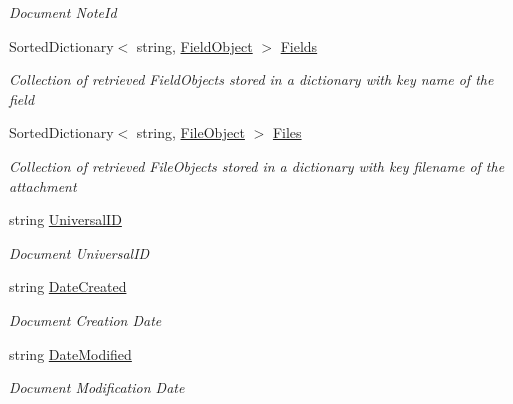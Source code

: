 \begin{DoxyCompactItemize}
\begin{DoxyCompactList}\small\item\em Document Note\+Id \end{DoxyCompactList}\item 
Sorted\+Dictionary$<$ string, \mbox{\hyperlink{class_field_object}{Field\+Object}} $>$ \mbox{\hyperlink{class_document_object_ae203b8a3e40b6c428145d2335b71245c}{Fields}}
\begin{DoxyCompactList}\small\item\em Collection of retrieved Field\+Objects stored in a dictionary with key name of the field \end{DoxyCompactList}\item 
Sorted\+Dictionary$<$ string, \mbox{\hyperlink{class_file_object}{File\+Object}} $>$ \mbox{\hyperlink{class_document_object_afe6bcf5175607f91dde768491f23a0a4}{Files}}
\begin{DoxyCompactList}\small\item\em Collection of retrieved File\+Objects stored in a dictionary with key filename of the attachment \end{DoxyCompactList}\item 
string \mbox{\hyperlink{class_document_object_a8b96d04632a2802e7cc5466ca5cee8cf}{Universal\+ID}}
\begin{DoxyCompactList}\small\item\em Document Universal\+ID \end{DoxyCompactList}\item 
string \mbox{\hyperlink{class_document_object_a819cb8baad094f6e5990c54ec1eee8b0}{Date\+Created}}
\begin{DoxyCompactList}\small\item\em Document Creation Date \end{DoxyCompactList}\item 
string \mbox{\hyperlink{class_document_object_a87ba1b3ac1b74b104972c25b245c504b}{Date\+Modified}}
\begin{DoxyCompactList}\small\item\em Document Modification Date \end{DoxyCompactList}\end{DoxyCompactItemize}


